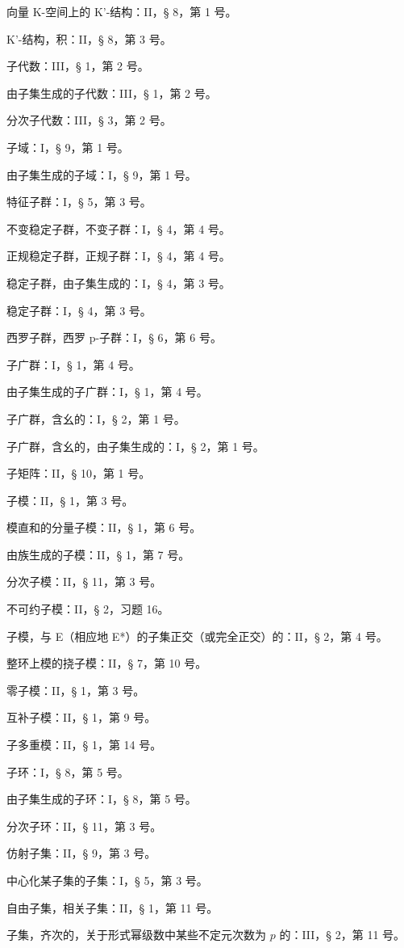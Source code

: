 向量 K-空间上的 K'-结构：II，§ 8，第 1 号。

K'-结构，积：II，§ 8，第 3 号。

子代数：III，§ 1，第 2 号。

由子集生成的子代数：III，§ 1，第 2 号。

分次子代数：III，§ 3，第 2 号。

子域：I，§ 9，第 1 号。

由子集生成的子域：I，§ 9，第 1 号。

特征子群：I，§ 5，第 3 号。

不变稳定子群，不变子群：I，§ 4，第 4 号。

正规稳定子群，正规子群：I，§ 4，第 4 号。

稳定子群，由子集生成的：I，§ 4，第 3 号。

稳定子群：I，§ 4，第 3 号。

西罗子群，西罗 p-子群：I，§ 6，第 6 号。

子广群：I，§ 1，第 4 号。

由子集生成的子广群：I，§ 1，第 4 号。

子广群，含幺的：I，§ 2，第 1 号。

子广群，含幺的，由子集生成的：I，§ 2，第 1 号。

子矩阵：II，§ 10，第 1 号。

子模：II，§ 1，第 3 号。

模直和的分量子模：II，§ 1，第 6 号。

由族生成的子模：II，§ 1，第 7 号。

分次子模：II，§ 11，第 3 号。

不可约子模：II，§ 2，习题 16。

子模，与 E（相应地 E*）的子集正交（或完全正交）的：II，§ 2，第 4 号。

整环上模的挠子模：II，§ 7，第 10 号。

零子模：II，§ 1，第 3 号。

互补子模：II，§ 1，第 9 号。

子多重模：II，§ 1，第 14 号。

子环：I，§ 8，第 5 号。

由子集生成的子环：I，§ 8，第 5 号。

分次子环：II，§ 11，第 3 号。

仿射子集：II，§ 9，第 3 号。

中心化某子集的子集：I，§ 5，第 3 号。

自由子集，相关子集：II，§ 1，第 11 号。

子集，齐次的，关于形式幂级数中某些不定元次数为 \(p\) 的：III，§ 2，第 11 号。

